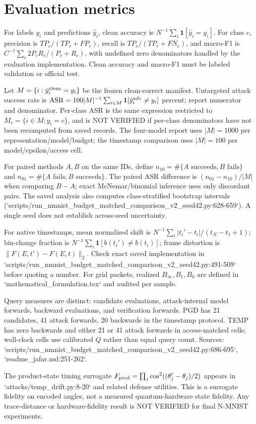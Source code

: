 \section{Evaluation metrics}
For labels $y_i$ and predictions $\hat y_i$, clean accuracy is $N^{-1}\sum_i\mathbf1[\hat y_i=y_i]$. For class $c$, precision is $TP_c/(TP_c+FP_c)$, recall is $TP_c/(TP_c+FN_c)$, and macro-F1 is $C^{-1}\sum_c 2P_cR_c/(P_c+R_c)$, with undefined zero denominators handled by the evaluation implementation. Clean accuracy and macro-F1 must be labeled validation or official test.

Let $M=\{i:\hat y_i^{\rm clean}=y_i\}$ be the frozen clean-correct manifest. Untargeted attack success rate is $\mathrm{ASR}=100|M|^{-1}\sum_{i\in M}\mathbf1[\hat y_i^{\rm adv}\ne y_i]$ percent; report numerator and denominator. Per-class ASR is the same expression restricted to $M_c=\{i\in M:y_i=c\}$, and is NOT VERIFIED if per-class denominators have not been recomputed from saved records. The four-model report uses $|M|=1000$ per representation/model/budget; the timestamp comparison uses $|M|=100$ per model/epsilon/access cell.

For paired methods $A,B$ on the same IDs, define $n_{10}=\#\{A\text{ succeeds},B\text{ fails}\}$ and $n_{01}=\#\{A\text{ fails},B\text{ succeeds}\}$. The paired ASR difference is $(n_{01}-n_{10})/|M|$ when comparing $B-A$; exact McNemar/binomial inference uses only discordant pairs. The saved analysis also computes class-stratified bootstrap intervals (`scripts/run_nmnist_budget_matched_comparison_v2_seed42.py:628-659`). A single seed does not establish across-seed uncertainty.

For native timestamps, mean normalized shift is $N^{-1}\sum_i|t_i'-t_i|/(t_N-t_1+1)$; bin-change fraction is $N^{-1}\sum_i\mathbf1[b(t_i')\ne b(t_i)]$; frame distortion is $\|F(E,t')-F(E,t)\|_2$. Check exact saved implementation in `scripts/run_nmnist_budget_matched_comparison_v2_seed42.py:491-509` before quoting a number. For grid packets, realized $B_\infty,B_1,B_0$ are defined in `mathematical_formulation.tex` and audited per sample.

Query measures are distinct: candidate evaluations, attack-internal model forwards, backward evaluations, and verification forwards. PGD has 21 candidates, 41 attack forwards, 20 backwards in the timestamp protocol. TEMP has zero backwards and either 21 or 41 attack forwards in access-matched cells; wall-clock cells use calibrated $Q$ rather than equal query count. Sources: `scripts/run_nmnist_budget_matched_comparison_v2_seed42.py:686-695`, `readme_jafar.md:251-262`.

The product-state timing surrogate $F_{\rm prod}=\prod_j\cos^2((\theta'_j-\theta_j)/2)$ appears in `attacks/temp_drift.py:8-20` and related defense utilities. This is a surrogate fidelity on encoded angles, not a measured quantum-hardware state fidelity. Any trace-distance or hardware-fidelity result is NOT VERIFIED for final N-MNIST experiments.
